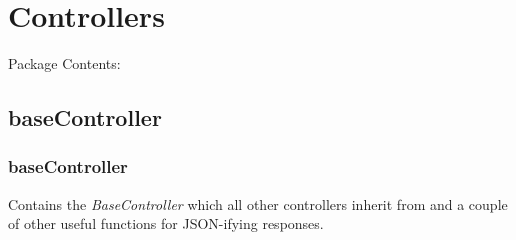 \documentclass[letterpaper,10pt,english]{manual}
\begin{document}
\resetcurrentobjects
\hypertarget{--doc-controllers}{}

\section{Controllers}

Package Contents:

\resetcurrentobjects
\hypertarget{--doc-baseController}{}

\subsection{baseController}
\hypertarget{module-webscavator.controllers.baseController}{}
\modulesynopsis{}

\subsubsection{baseController}

Contains the \emph{BaseController} which all other controllers inherit from and a couple of other useful
functions for JSON-ifying responses.
\end{document}
